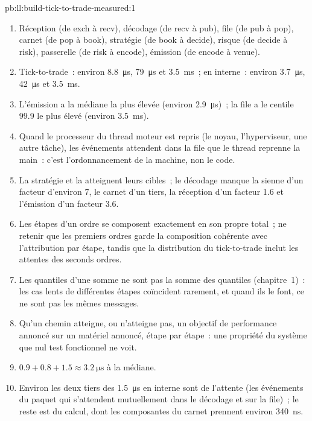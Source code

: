 \begin{solution}{pb:ll:build-tick-to-trade-measured:1}
\begin{enumerate}
\item Réception (de exch à recv), décodage (de recv à pub), file (de pub à pop), carnet (de pop à book), stratégie (de book à decide), risque (de decide
à risk), passerelle (de risk à encode), émission (de encode à venue).
\item Tick-to-trade~: environ \qty{8.8}{\micro\second}, \qty{79}{\micro\second} et \qty{3.5}{\milli\second}~; en interne~: environ
\qty{3.7}{\micro\second}, \qty{42}{\micro\second} et \qty{3.5}{\milli\second}.
\item L'émission a la médiane la plus élevée (environ \qty{2.9}{\micro\second})~; la file a le centile 99.9 le plus élevé (environ
\qty{3.5}{\milli\second}).
\item Quand le processeur du thread moteur est repris (le noyau, l'hyperviseur, une autre tâche), les événements attendent dans la file que le
thread reprenne la main~: c'est l'ordonnancement de la machine, non le code.
\item La stratégie et la  atteignent leurs cibles~; le décodage manque la sienne d'un facteur d'environ 7, le carnet d'un tiers, la réception d'un facteur 1.6 et
l'émission d'un facteur 3.6.
\item Les étapes d'un ordre se composent exactement en son propre total~; ne retenir que les premiers ordres garde la composition cohérente avec
l'attribution par étape, tandis que la distribution du tick-to-trade inclut les attentes des seconds ordres.
\item Les quantiles d'une somme ne sont pas la somme des quantiles (chapitre~1)~: les cas lents de différentes étapes coïncident rarement, et quand
ils le font, ce ne sont pas les mêmes messages.
\item Qu'un chemin atteigne, ou n'atteigne pas, un objectif de performance annoncé sur un matériel annoncé, étape par étape~: une propriété du
système que nul test fonctionnel ne voit.
\item $0.9 + 0.8 + 1.5 \approx \qty{3.2}{\micro\second}$ à la médiane.
\item Environ les deux tiers des \qty{1.5}{\micro\second} en interne sont de l'attente (les événements du paquet qui s'attendent mutuellement dans
le décodage et sur la file)~; le reste est du calcul, dont les composantes du carnet prennent environ \qty{340}{\nano\second}.

\end{enumerate}
\end{solution}
